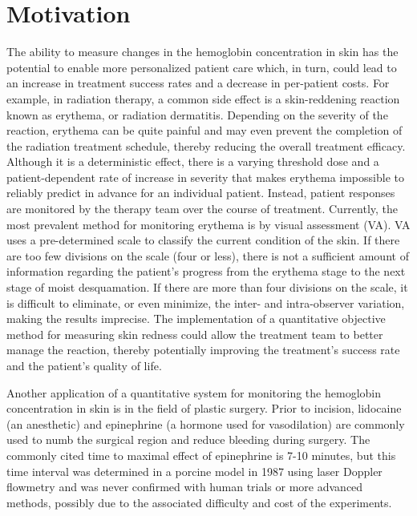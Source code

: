 \section{Motivation}
The ability to measure changes in the hemoglobin concentration in skin has the potential to enable more personalized patient care which, in turn, could lead to an increase in treatment success rates and a decrease in per-patient costs. For example, in radiation therapy, a common side effect is a skin-reddening reaction known as erythema, or radiation dermatitis.\cite{McQuestion2006} Depending on the severity of the reaction, erythema can be quite painful and may even prevent the completion of the radiation treatment schedule, thereby reducing the overall treatment efficacy.\cite{Maciejewski1989} Although it is a deterministic effect, there is a varying threshold dose and a patient-dependent rate of increase in severity\cite{Hall2000} that makes erythema impossible to reliably predict in advance for an individual patient.\cite{Porock2002} Instead, patient responses are monitored by the therapy team over the course of treatment. Currently, the most prevalent method for monitoring erythema is by visual assessment (VA).\cite{McQuestion2006,Wong2013,Chan2014} VA uses a pre-determined scale to classify the current condition of the skin. If there are too few divisions on the scale (four or less), there is not a sufficient amount of information regarding the patient’s progress from the erythema stage to the next stage of moist desquamation. If there are more than four divisions on the scale, it is difficult to eliminate, or even minimize, the inter- and intra-observer variation, making the results imprecise. The implementation of a quantitative objective method for measuring skin redness could allow the treatment team to better manage the reaction, thereby potentially improving the treatment’s success rate and the patient’s quality of life.

Another application of a quantitative system for monitoring the hemoglobin concentration in skin is in the field of plastic surgery. Prior to incision, lidocaine (an anesthetic) and epinephrine (a hormone used for vasodilation) are commonly used to numb the surgical region and reduce bleeding during surgery. The commonly cited time to maximal effect of epinephrine is 7-10 minutes, but this time interval was determined in a porcine model\cite{Larrabee1987} in 1987 using laser Doppler flowmetry\cite{Swain1989} and was never confirmed with human trials or more advanced methods, possibly due to the associated difficulty and cost of the experiments.


